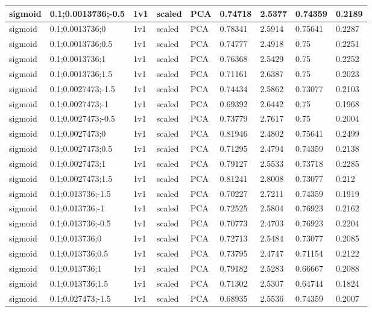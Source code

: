 \begin{longtable}{lllllllll}
sigmoid & 0.1;0.0013736;-0.5 & 1v1 & scaled & PCA & 0.74718 & 2.5377 & 0.74359 & 0.2189\\ \hline
sigmoid & 0.1;0.0013736;0 & 1v1 & scaled & PCA & 0.78341 & 2.5914 & 0.75641 & 0.2287\\ \hline
sigmoid & 0.1;0.0013736;0.5 & 1v1 & scaled & PCA & 0.74777 & 2.4918 & 0.75 & 0.2251\\ \hline
sigmoid & 0.1;0.0013736;1 & 1v1 & scaled & PCA & 0.76368 & 2.5429 & 0.75 & 0.2252\\ \hline
sigmoid & 0.1;0.0013736;1.5 & 1v1 & scaled & PCA & 0.71161 & 2.6387 & 0.75 & 0.2023\\ \hline
sigmoid & 0.1;0.0027473;-1.5 & 1v1 & scaled & PCA & 0.74434 & 2.5862 & 0.73077 & 0.2103\\ \hline
sigmoid & 0.1;0.0027473;-1 & 1v1 & scaled & PCA & 0.69392 & 2.6442 & 0.75 & 0.1968\\ \hline
sigmoid & 0.1;0.0027473;-0.5 & 1v1 & scaled & PCA & 0.73779 & 2.7617 & 0.75 & 0.2004\\ \hline
sigmoid & 0.1;0.0027473;0 & 1v1 & scaled & PCA & 0.81946 & 2.4802 & 0.75641 & 0.2499\\ \hline
sigmoid & 0.1;0.0027473;0.5 & 1v1 & scaled & PCA & 0.71295 & 2.4794 & 0.74359 & 0.2138\\ \hline
sigmoid & 0.1;0.0027473;1 & 1v1 & scaled & PCA & 0.79127 & 2.5533 & 0.73718 & 0.2285\\ \hline
sigmoid & 0.1;0.0027473;1.5 & 1v1 & scaled & PCA & 0.81241 & 2.8008 & 0.73077 & 0.212\\ \hline
sigmoid & 0.1;0.013736;-1.5 & 1v1 & scaled & PCA & 0.70227 & 2.7211 & 0.74359 & 0.1919\\ \hline
sigmoid & 0.1;0.013736;-1 & 1v1 & scaled & PCA & 0.72525 & 2.5804 & 0.76923 & 0.2162\\ \hline
sigmoid & 0.1;0.013736;-0.5 & 1v1 & scaled & PCA & 0.70773 & 2.4703 & 0.76923 & 0.2204\\ \hline
sigmoid & 0.1;0.013736;0 & 1v1 & scaled & PCA & 0.72713 & 2.5484 & 0.73077 & 0.2085\\ \hline
sigmoid & 0.1;0.013736;0.5 & 1v1 & scaled & PCA & 0.73795 & 2.4747 & 0.71154 & 0.2122\\ \hline
sigmoid & 0.1;0.013736;1 & 1v1 & scaled & PCA & 0.79182 & 2.5283 & 0.66667 & 0.2088\\ \hline
sigmoid & 0.1;0.013736;1.5 & 1v1 & scaled & PCA & 0.71302 & 2.5307 & 0.64744 & 0.1824\\ \hline
sigmoid & 0.1;0.027473;-1.5 & 1v1 & scaled & PCA & 0.68935 & 2.5536 & 0.74359 & 0.2007\\ \hline

\end{longtable}
